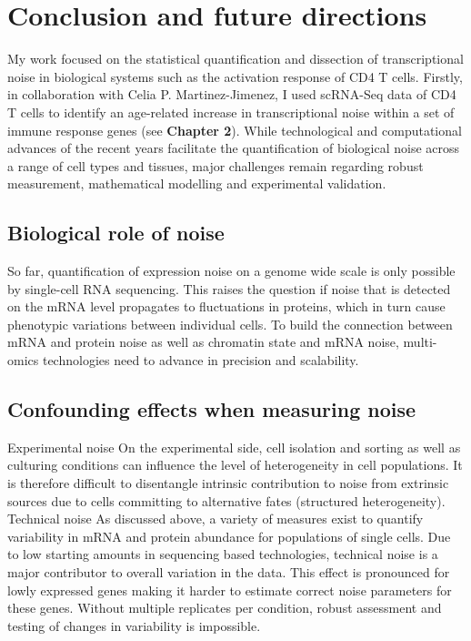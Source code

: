 
\chapter{Conclusion and future directions}  

\vspace{-5mm}

My work focused on the statistical quantification and dissection of transcriptional noise in biological systems such as the activation response of CD4\plus{} T cells. Firstly, in collaboration with Celia P. Martinez-Jimenez, I used scRNA-Seq data of CD4\plus{} T cells to identify an age-related increase in transcriptional noise within a set of immune response genes (see \textbf{Chapter 2}).   
While technological and computational advances of the recent years facilitate the quantification of biological noise across a range of cell types and tissues, major challenges remain regarding robust measurement, mathematical modelling and experimental validation. 

\section{Biological role of noise}

So far, quantification of expression noise on a genome wide scale is only possible by single-cell RNA sequencing. This raises the question if noise that is detected on the mRNA level propagates to fluctuations in proteins, which in turn cause phenotypic variations between individual cells. To build the connection between mRNA and protein noise as well as chromatin state and mRNA noise, multi-omics technologies need to advance in precision and scalability.

\section{Confounding effects when measuring noise}

Experimental noise
On the experimental side, cell isolation and sorting as well as culturing conditions can influence the level of heterogeneity in cell populations. It is therefore difficult to disentangle intrinsic contribution to noise from extrinsic sources due to cells committing to alternative fates (structured heterogeneity).  \\

Technical noise
As discussed above, a variety of measures exist to quantify variability in mRNA and protein abundance for populations of single cells. Due to low starting amounts in sequencing based technologies, technical noise is a major contributor to overall variation in the data. This effect is pronounced for lowly expressed genes making it harder to estimate correct noise parameters for these genes. Without multiple replicates per condition, robust assessment and testing of changes in variability is impossible.\\

